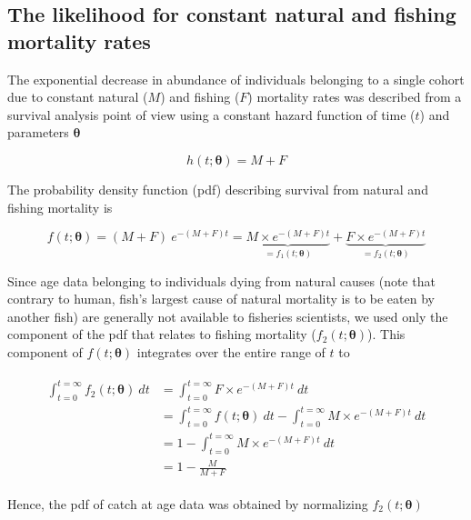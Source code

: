 \documentclass[12pt]{article}
\begin{document}
\subsection{The likelihood for constant natural and fishing mortality rates} 

The exponential decrease in abundance of individuals belonging to a single cohort due to constant natural ($M$) and fishing ($F$) mortality rates was described from a survival analysis point of view \citep{scimar42,cox84b} using a constant hazard function of time ($t$) and parameters $\bm{\theta}$

\begin{equation}
h(t; \bm{\theta}) = M + F
\end{equation}

The probability density function (pdf) describing survival from natural and fishing mortality is

\begin{equation}
f(t; \bm{\theta}) = (M + F) \ e^{-(M+F)t} = \underbrace{M \times e^{-(M+F)t}}_{=f_{1}(t; \bm{\theta})} + \underbrace{F \times e^{-(M+F)t}}_{=f_{2}(t; \bm{\theta})}
\end{equation}

Since age data belonging to individuals dying from natural causes (note that contrary to human, fish's largest cause of natural mortality is to be eaten by another fish) are generally not available to fisheries scientists, we used only the component of the pdf that relates to fishing mortality ($f_{2}(t; \bm{\theta})$). This component of $f(t; \bm{\theta})$ integrates over the entire range of $t$ to 

\begin{align}
\begin{split}
 \int_{t=0}^{t=\infty} f_{2}(t; \bm{\theta}) \ dt &= \int_{t=0}^{t=\infty} F \times e^{-(M+F)t} \ dt\\
                                         &= \int_{t=0}^{t=\infty} f(t; \bm{\theta}) \ dt - \int_{t=0}^{t=\infty} M \times e^{-(M+F)t} \ dt\\
                                         &= 1 - \int_{t=0}^{t=\infty} M \times e^{-(M+F)t} \ dt \\
                                         &= 1 - \frac{M}{M+F}
\end{split}
\end{align}

Hence, the pdf of catch at age data was obtained by normalizing $f_{2}(t; \bm{\theta})$
\end{document}
